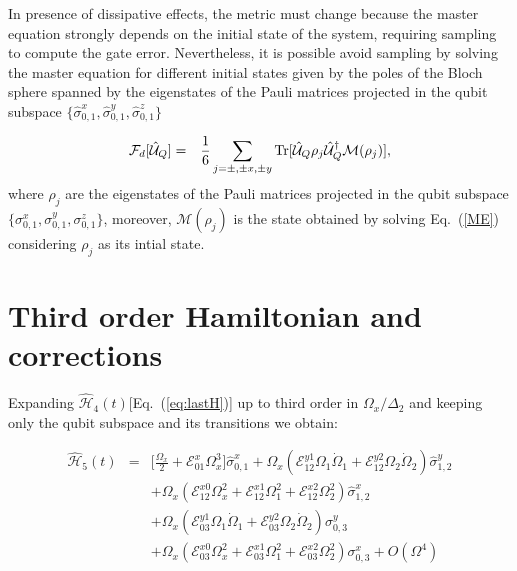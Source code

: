 \documentclass[superscriptaddress,amsmath,amssymb,aps,twocolumn,praplied,notitlepage]{revtex4-2}
\begin{document}
In presence of dissipative effects, the metric must change because the master equation strongly depends on the initial state of the system, requiring sampling to compute the gate error. Nevertheless, it is possible avoid sampling by solving the master equation for different initial states given by the poles of the Bloch sphere spanned by the eigenstates of the Pauli matrices projected in the qubit subspace $\{\hat{\sigma}^{x}_{0,1},\hat{\sigma}^{y}_{0,1},\hat{\sigma}^{z}_{0,1}\}$

\begin{eqnarray}
\mathcal{F}_{d}[\hat{\mathcal{U}}_Q]&=&\frac{1}{6}\sum_{j=\pm,\pm x, \pm y}{\rm{Tr}}[\hat{\mathcal{U}}_Q\rho_{j}\hat{\mathcal{U}}_Q^{\dag}\mathcal{M}(\rho_j)],
\end{eqnarray}
where $\rho_j$ are the eigenstates of the Pauli matrices projected in the qubit subspace $\{\sigma^{x}_{0,1},\sigma^{y}_{0,1},\sigma^{z}_{0,1}\}$, moreover, $\mathcal{M}(\rho_j)$ is the state obtained by solving Eq.~(\ref{ME}) considering $\rho_j$ as its intial state. 



\section{Third order Hamiltonian and corrections}\label{supralinear_corrections_annex}

Expanding $\hat{\mathcal{H}}_4(t)$[Eq.~(\ref{eq:lastH})]  up to third order in $\Omega_x/ \Delta_2$ and keeping only the qubit subspace and its transitions we obtain:

\begin{eqnarray}
    \hat{\mathcal{H}}_5(t) &=& \bigg[\frac{\Omega_x}{2}+\mathcal{E}^x_{01}\Omega_x^3\bigg]\hat{\sigma}_{0,1}^x+\Omega_x(\mathcal{E}^{y1}_{12}\Omega_1\dot\Omega_1+\mathcal{E}^{y2}_{12}\Omega_2\dot\Omega_2)\hat{\sigma}_{1,2}^y \nonumber \\
    &&+ \Omega_x(\mathcal{E}^{x0}_{12}\Omega_x^2+\mathcal{E}^{x1}_{12}\Omega_1^2+\mathcal{E}^{x2}_{12}\Omega_2^2)\hat{\sigma}_{1,2}^x \nonumber \\
    &&+ \Omega_x(\mathcal{E}^{y1}_{03}\Omega_1\dot{\Omega}_1+ \mathcal{E}^{y2}_{03}\Omega_2\dot{\Omega}_2)\sigma_{0,3}^y \nonumber \\
    &&
    + \Omega_x(\mathcal{E}^{x0}_{03}\Omega_x^2+\mathcal{E}^{x1}_{03}\Omega_1^2+\mathcal{E}^{x2}_{03}\Omega_2^2)\sigma_{0,3}^x + O(\Omega^4)
    \label{eq:finalH}
\end{eqnarray}
\end{document}
